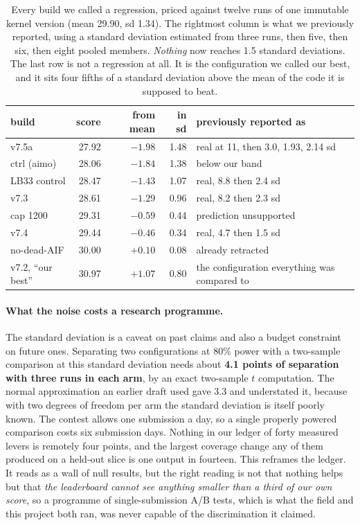 \documentclass[11pt]{article}
\begin{document}
\begin{table}[H]
\centering
\caption{Every build we called a regression, priced against twelve runs of one immutable kernel
version (mean 29.90, sd 1.34). The rightmost column is what we previously reported, using a standard
deviation estimated from three runs, then five, then six, then eight pooled members. \emph{Nothing}
now reaches 1.5 standard deviations. The last row is not a regression at all. It is the configuration
we called our best, and it sits four fifths of a standard deviation above the mean of the code it is
supposed to beat.}
\label{tab:allnoise}
\begin{tabular}{lrrrl}
\toprule
build & score & from mean & in sd & previously reported as \\
\midrule
v7.5a           & 27.92 & $-1.98$ & 1.48 & real at 11, then 3.0, 1.93, 2.14 sd \\
ctrl (aimo)     & 28.06 & $-1.84$ & 1.38 & below our band \\
LB33 control    & 28.47 & $-1.43$ & 1.07 & real, 8.8 then 2.4 sd \\
v7.3            & 28.61 & $-1.29$ & 0.96 & real, 8.2 then 2.3 sd \\
cap 1200        & 29.31 & $-0.59$ & 0.44 & prediction unsupported \\
v7.4            & 29.44 & $-0.46$ & 0.34 & real, 4.7 then 1.5 sd \\
no-dead-AIF     & 30.00 & $+0.10$ & 0.08 & already retracted \\
\midrule
v7.2, ``our best'' & 30.97 & $+1.07$ & 0.80 & the configuration everything was compared to \\
\bottomrule
\end{tabular}
\end{table}

\paragraph{What the noise costs a research programme.}
The standard deviation is a caveat on past claims and also a budget constraint on future ones.
Separating two configurations at 80\% power with a two-sample comparison at this standard deviation
needs about \textbf{4.1 points of separation with three runs in each arm}, by an exact two-sample $t$
computation. The normal approximation an earlier draft used gave 3.3 and understated it, because with
two degrees of freedom per arm the standard deviation is itself poorly known. The contest allows one
submission a day, so a single properly powered comparison costs six submission days. Nothing in our
ledger of forty measured levers is remotely four points, and the largest coverage change any of
them produced on a held-out slice is one output in fourteen. This reframes the ledger. It reads as a
wall of null results, but the right reading is not that nothing helps but that \emph{the leaderboard
cannot see anything smaller than a third of our own score}, so a programme of single-submission
A/B tests, which is what the field and this project both ran, was never capable of the discrimination
it claimed.
\end{document}

